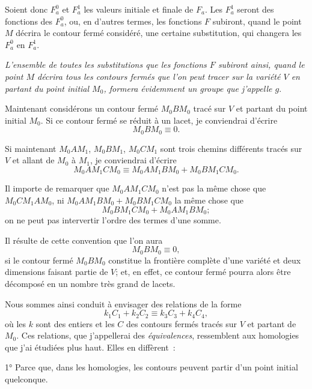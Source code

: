 \documentclass{article}
\begin{document}
Soient donc $F^{0}_{a}$ et $F^{1}_{a}$ les valeurs initiale et finale de $F_{a}$. Les $F^{1}_{a}$ seront des fonctions des $F^{0}_{a}$, ou, en d'autres termes, les fonctions $F$ subiront, quand le point $M$ décrira le contour fermé considéré, une certaine substitution, qui changera les $F^{0}_{a}$ en $F^{1}_{a}$.

\emph{L'ensemble de toutes les substitutions que les fonctions $F$ subiront ainsi, quand le point $M$ décrira tous les contours fermés que l'on peut tracer sur la variété $V$ en partant du point initial $M_{0}$, formera évidemment un groupe que j'appelle $g$}.

Maintenant considérons un contour fermé $M_{0}BM_{0}$ tracé sur $V$ et partant du point initial $M_{0}$. Si ce contour fermé se réduit à un lacet, je conviendrai d'écrire
\[ M_{0}BM_{0} \equiv 0. \]

Si maintenant $M_{0}AM_{1}$, $M_{0}BM_{1}$, $M_{0}CM_{1}$ sont trois chemins différents tracés sur $V$ et allant de $M_{0}$ à $M_{1}$, je conviendrai d'écrire
\[ M_{0}AM_{1}CM_{0} \equiv M_{0}AM_{1}BM_{0} + M_{0}BM_{1}CM_{0}. \]

Il importe de remarquer que $M_{0}AM_{1}CM_{0}$ n'est pas la même chose que $M_{0}CM_{1}AM_{0}$, ni $M_{0}AM_{1}BM_{0} + M_{0}BM_{1}CM_{0}$ la même chose que
\[ M_{0}BM_{1}CM_{0} + M_{0}AM_{1}BM_{0}; \]
on ne peut pas intervertir l'ordre des termes d'une somme.

Il résulte de cette convention que l'on aura
\[ M_{0}BM_{0} \equiv 0, \]
si le contour fermé $M_{0}BM_{0}$ constitue la frontière complète d'une variété et deux dimensions faisant partie de $V$; et, en effet, ce contour fermé pourra alors être décomposé en un nombre très grand de lacets.

Nous sommes ainsi conduit à envisager des relations de la forme
\[ k_{1}C_{1} + k_{2}C_{2} \equiv k_{3}C_{3} + k_{4}C_{4}, \]
où les $k$ sont des entiers et les $C$ des contours fermés tracés sur $V$ et partant de $M_{0}$. Ces relations, que j'appellerai des \emph{équivalences}, ressemblent aux homologies que j'ai étudiées plus haut. Elles en diffèrent~:

1° Parce que, dans les homologies, les contours peuvent partir d'un point initial quelconque.
\end{document}
